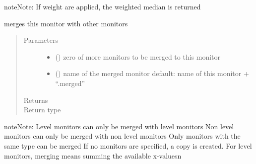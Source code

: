 \documentclass[letterpaper,10pt,english]{sphinxmanual}
\begin{document}
\begin{fulllineitems}
\begin{fulllineitems}
\begin{sphinxadmonition}{note}{Note:}
If weight are applied, the weighted median is returned
\end{sphinxadmonition}

\end{fulllineitems}


\begin{fulllineitems}
\label{\detokenize{Reference:salabim.Monitor.merge}}
merges this monitor with other monitors
\begin{quote}\begin{description}
\item[{Parameters}] \leavevmode\begin{itemize}
\item {} 
 () \textendash{} zero of more monitors to be merged to this monitor

\item {} 
 () \textendash{} name of the merged monitor 
default: name of this monitor + “.merged”

\end{itemize}

\item[{Returns}] \leavevmode
{}

\item[{Return type}] \leavevmode
{\hyperref[\detokenize{Reference:salabim.Monitor}]{}}

\end{description}\end{quote}

\begin{sphinxadmonition}{note}{Note:}
Level monitors can only be merged with level monitors 
Non level monitors can only be merged with non level monitors 
Only monitors with the same type can be merged 
If no monitors are specified, a copy is created. 
For level monitors, merging means summing the available x-values\textbar{}n\textbar{}
\end{sphinxadmonition}

\end{fulllineitems}



\end{fulllineitems}
\end{document}
